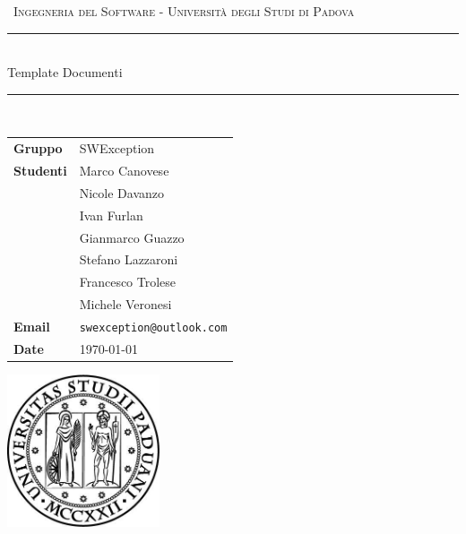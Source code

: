\documentclass[12pt,italian,openany,a4paper]{book}
\begin{document}
	
	
	\begin{titlepage}
		\clearpage\thispagestyle{empty}
		\centering
		\vspace{1cm}
		
		{\
			\textsc{Ingegneria del Software - Università degli Studi di Padova}
		}
		\vspace{2.5cm}
		
		\rule{\linewidth}{2mm} \\[0.8cm]
		{ \LARGE \sc Template Documenti}\\[0.55cm]
		\rule{\linewidth}{0.6mm} \\[3.4cm]
		
		\hspace{2cm}
		\begin{tabular}{l p{5cm}}
			\textbf{Gruppo} & SWException \\[10pt]
			\textbf{Studenti} & Marco Canovese \\ & Nicole Davanzo \\ & Ivan Furlan \\ & Gianmarco Guazzo \\ & Stefano Lazzaroni \\ & Francesco Trolese \\ & Michele Veronesi \\[10pt]
			\textbf{Email} & \texttt{swexception@outlook.com} \\[10pt]
			\textbf{Date} & \today \\            
		\end{tabular}
		
		
		\vfill
		\centering \includegraphics[width=4.5cm]{logo.jpg}\\ %
		\vspace{0.5cm}
	\end{titlepage}
	\tableofcontents
	
	\newpage
	
\end{document}
